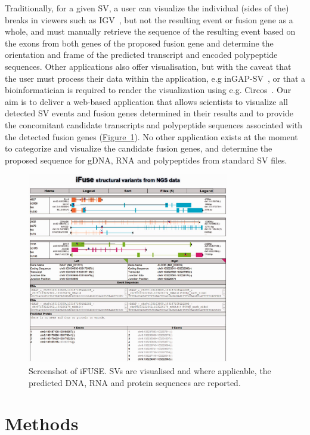 Traditionally, for a given SV, a user can visualize the individual (sides of the) breaks in viewers such as IGV~\cite{thorvaldsdottir2013integrative,robinson2011integrative}, but not the resulting event or fusion gene as a whole, and must manually retrieve the sequence of the resulting event based on the exons from both genes of the proposed fusion gene and determine the orientation and frame of the predicted transcript and encoded polypeptide sequences. Other applications also offer visualisation, but with the caveat that the user must process their data within the application, e.g inGAP-SV~\cite{qi2011ingap}, or that a bioinformatician is required to render the visualization using e.g. Circos~\cite{krzywinski2009circos}. Our aim is to deliver a web-based application that allows scientists to visualize all detected SV events and fusion genes determined in their results and to provide the concomitant candidate transcripts and polypeptide sequences associated with the detected fusion genes (\hyperref[fig:screenshot]{Figure~\ref*{fig:screenshot}}). No other application exists at the moment to categorize and visualize the candidate fusion genes, and determine the proposed sequence for gDNA, RNA and polypeptides from standard SV files.

\begin{figure}
\centerline{\includegraphics[width=250pt]{chapters/images/iFUSE/ifusess.jpeg}}
\caption{Screenshot of iFUSE\@. SVs are visualised and where applicable, the predicted DNA, RNA and protein sequences are reported.}
\label{fig:screenshot}
\end{figure}


\section*{Methods}

